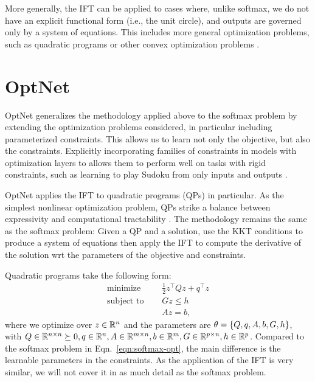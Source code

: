 \documentclass[11pt]{article}
\begin{document}
More generally, the IFT can be applied to cases where, unlike softmax,
we do not have an explicit functional form (i.e., the unit circle),
and outputs are governed only by a system of equations.
This includes more general optimization problems, such as quadratic programs \citep{optnet}
or other convex optimization problems \citep{agrawal2019diffcvx}.

\section{OptNet}
OptNet generalizes the methodology applied above to the softmax problem by
extending the optimization problems considered,
in particular including parameterized constraints.
This allows us to learn not only the objective, but also the constraints.
Explicitly incorporating families of constraints in models
with optimization layers to allows them to perform well
on tasks with rigid constraints, such as learning to play
Sudoku from only inputs and outputs \citep{optnet}.

OptNet applies the IFT to quadratic programs (QPs) in particular.
As the simplest nonlinear optimization problem,
QPs strike a balance between expressivity and computational tractability \citep{simplex}.
The methodology remains the same as the softmax problem:
Given a QP and a solution,
use the KKT conditions to produce a system of equations then apply the IFT
to compute the derivative of the solution wrt the
parameters of the objective and constraints.

Quadratic programs take the following form:
\begin{equation}
\label{eqn:qp}
\begin{aligned}
\textrm{minimize } \quad & \frac12 z^\top Q z + q^\top z\\
\textrm{subject to } \quad
& Gz \leq h\\
& Az = b,
\end{aligned}
\end{equation}
where we optimize over $z\in\mathbb{R}^n$ and the parameters are $\theta = \left\{Q, q, A, b, G, h\right\}$,
with $Q\in\mathbb{R}^{n\times n}\succeq0, q\in\mathbb{R}^n, A\in\mathbb{R}^{m\times n},b\in\mathbb{R}^{m},G\in\mathbb{R}^{p\times n},
h\in\mathbb{R}^p$.
Compared to the softmax problem in Eqn.~\ref{eqn:softmax-opt},
the main difference is the learnable parameters in the constraints.
As the application of the IFT is very similar, we will not cover it in as much
detail as the softmax problem.
\end{document}
